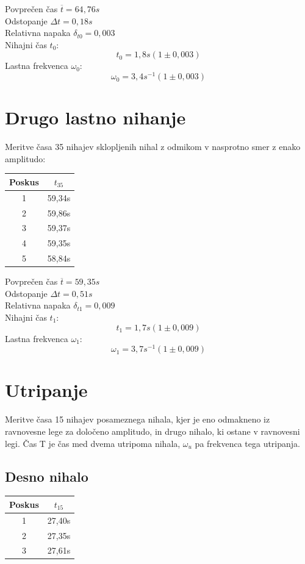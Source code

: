 \documentclass[a4paper]{report}
\begin{document}
\noindent Povprečen čas $\overline t = 64,76s$ \\
Odstopanje $\Delta t = 0,18s$\\
Relativna napaka $\delta_{t0} = 0,003$ \\
Nihajni čas  $t_0$:
\[
  t_0= 1,8s (1 \pm 0,003)
\]
Lastna frekvenca $\omega_0$:
\[
  \omega_0 = 3,4s^{-1} (1 \pm  0,003)
\]

\chapter*{Drugo lastno nihanje}

Meritve časa 35 nihajev sklopljenih nihal z odmikom v nasprotno smer z enako amplitudo:

\begin{center}
  \begin{tabular}{| c | c |}
    \hline
    Poskus & $t_{35}$ \\ \hline
    1 & 59,34s \\ \hline
    2 & 59,86s \\ \hline
    3 & 59,37s \\ \hline
    4 & 59,35s \\ \hline
    5 & 58,84s \\
    \hline
  \end{tabular}
\end{center}

\noindent Povprečen čas $\overline t = 59,35s$ \\
Odstopanje $\Delta t = 0,51s$\\
Relativna napaka $\delta_{t1} = 0,009$ \\
Nihajni čas  $t_1$:
\[
  t_1= 1,7s (1 \pm 0,009)
\]
Lastna frekvenca $\omega_1$:
\[
  \omega_1 = 3,7s^{-1} (1 \pm  0,009)
\]

\chapter*{Utripanje}

Meritve časa 15 nihajev posameznega nihala, kjer je eno odmakneno iz ravnovesne lege za določeno amplitudo, in drugo nihalo, ki ostane v ravnovesni legi. Čas T je čas med dvema utripoma
nihala, $\omega_u$ pa frekvenca tega utripanja.

\section*{Desno nihalo}

\begin{center}
  \begin{tabular}{| c | c |}
    \hline
    Poskus & $t_{15}$ \\ \hline
    1 & 27,40s \\ \hline
    2 & 27,35s \\ \hline
    3 & 27,61s \\
    \hline
  \end{tabular}
\end{center}
\end{document}
